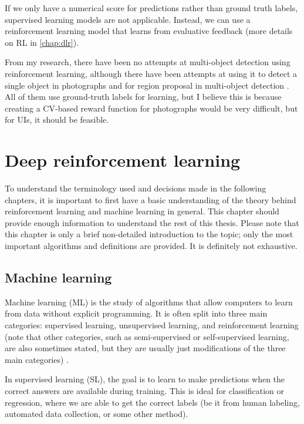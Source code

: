 \documentclass[
  digital,     %
  oneside,     %
  nosansbold,  %
  nocolorbold, %
  lof,         %
  lot,         %
]{fithesis4}
\begin{document}
If we only have a numerical score for predictions rather than ground truth labels, supervised learning models are not applicable. Instead, we can use a reinforcement learning model that learns from evaluative feedback (more details on RL in \autoref{chap:dlr}).

From my research, there have been no attempts at multi-object detection using reinforcement learning, although there have been attempts at using it to detect a single object in photographs \cite{dlr_object_detection, iterative_od_with_rl, hierarchical_od_with_drl} and for region proposal in multi-object detection \cite{drl_rpn}. All of them use ground-truth labels for learning, but I believe this is because creating a CV-based reward function for photographs would be very difficult, but for UIs, it should be feasible. 

\chapter{Deep reinforcement learning}
\label{chap:dlr}

To understand the terminology used and decisions made in the following chapters, it is important to first have a basic understanding of the theory behind reinforcement learning and machine learning in general. This chapter should provide enough information to understand the rest of this thesis. Please note that this chapter is only a brief non-detailed introduction to the topic; only the most important algorithms and definitions are provided. It is definitely not exhaustive.

\section{Machine learning}
Machine learning (ML) is the study of algorithms that allow computers to learn from data without explicit programming. It is often split into three main categories: supervised learning, unsupervised learning, and reinforcement learning (note that other categories, such as semi-supervised or self-supervised learning, are also sometimes stated, but they are usually just modifications of the three main categories) \cite{IB031}.

In supervised learning (SL), the goal is to learn to make predictions when the correct answers are available during training. This is ideal for classification or regression, where we are able to get the correct labels (be it from human labeling, automated data collection, or some other method).
\end{document}
